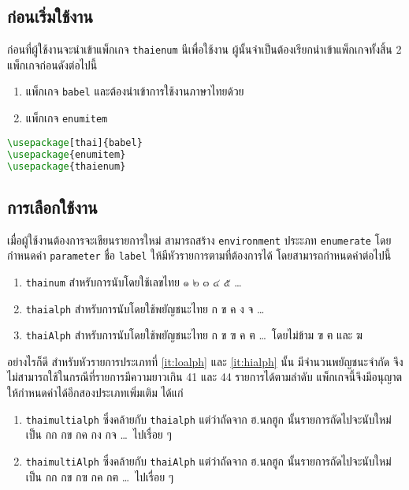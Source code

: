 \documentclass[11pt]{ltxguide}
\begin{document}
\subsection{ก่อนเริ่มใช้งาน}

ก่อนที่ผู้ใช้งานจะนำเข้าแพ็กเกจ \texttt{thaienum} นีเพื่อใช้งาน ผู้นั้นจำเป็นต้องเรียกนำเข้าแพ็กเกจทั้งสิ้น 2 แพ็กเกจก่อนดังต่อไปนี้
\begin{enumerate}[topsep=0.25pc,itemsep=0pc,label={\thainum*.}]
    \item  แพ็กเกจ \texttt{babel} และต้องนำเข้าการใช้งานภาษาไทยด้วย
    \item  แพ็กเกจ \texttt{enumitem}
\end{enumerate}

\begin{lstlisting}[language=LaTeX]
\usepackage[thai]{babel}
\usepackage{enumitem}
\usepackage{thaienum}
\end{lstlisting}

\subsection{การเลือกใช้งาน}

เมื่อผู้ใช้งานต้องการจะเขียนรายการใหม่ สามารถสร้าง \texttt{environment} ประะภท \texttt{enumerate} โดยกำหนดค่า \texttt{parameter} ชื่อ \texttt{label} ให้มีหัวรายการตามที่ต้องการได้ โดยสามารถกำหนดค่าต่อไปนี้

\begin{enumerate}[topsep=0.25pc,itemsep=0pc,label={\thainum*.}]
    \item  \texttt{thainum} สำหรับการนับโดยใช้เลขไทย ๑ ๒ ๓ ๔ ๕ \ldots
    \item  \label{it:loalph} \texttt{thaialph} สำหรับการนับโดยใช้พยัญชนะไทย ก ข ค ง จ \ldots
    \item  \label{it:hialph} \texttt{thaiAlph} สำหรับการนับโดยใช้พยัญชนะไทย ก ข ฃ ค ฅ \ldots\, โดยไม่ข้าม ฃ ฅ และ ฆ
\end{enumerate}

\medskip
อย่างไรก็ดี สำหรับหัวรายการประเภทที่ \ref{it:loalph} และ \ref{it:hialph} นั้น มีจำนวนพยัญชนะจำกัด จึงไม่สามารถใช้ในกรณีที่รายการมีความยาวเกิน 41 และ 44 รายการได้ตามลำดับ แพ็กเกจนี้จึงมีอนุญาตให้กำหนดค่าได้อีกสองประเภทเพิ่มเติม ได้แก่

\begin{enumerate}[topsep=0.25pc,itemsep=0pc,start=4,label={\thainum*.}]
    \item  \texttt{thaimultialph} ซึ่งคล้ายกับ \texttt{thaialph} แต่ว่าถัดจาก ฮ.นกฮูก นั้นรายการถัดไปจะนับใหม่เป็น กก กข กค กง กจ \ldots\, ไปเรื่อย ๆ
    \item  \texttt{thaimultiAlph} ซึ่งคล้ายกับ \texttt{thaiAlph} แต่ว่าถัดจาก ฮ.นกฮูก นั้นรายการถัดไปจะนับใหม่เป็น กก กข กฃ กค กฅ \ldots\, ไปเรื่อย ๆ
\end{enumerate}
\end{document}
